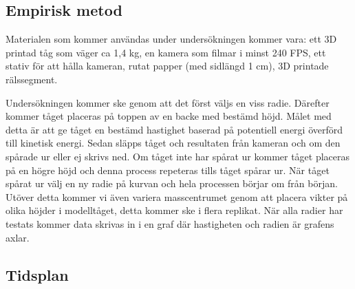 \subsection{Empirisk metod}
\label{sec:metod}
Materialen som kommer användas under undersökningen kommer vara: ett 3D printad tåg som väger ca 1,4 kg, en kamera som filmar i minst 240 FPS, ett stativ för att hålla kameran, rutat papper (med sidlängd 1 cm), 3D printade rälssegment.

Undersökningen kommer ske genom att det först väljs en viss radie. Därefter kommer tåget placeras på toppen av en backe med bestämd höjd. Målet med detta är att ge tåget en bestämd hastighet baserad på potentiell energi överförd till kinetisk energi. Sedan släpps tåget och resultaten från kameran och om den spårade ur eller ej skrivs ned. Om tåget inte har spårat ur kommer tåget placeras på en högre höjd och denna process repeteras tills tåget spårar ur. När tåget spårat ur välj en ny radie på kurvan och hela processen börjar om från början. Utöver detta kommer vi även variera masscentrumet genom att placera vikter på olika höjder i modelltåget, detta kommer ske i flera replikat. När alla radier har testats kommer data skrivas in i en graf där hastigheten och radien är grafens axlar.



\subsection{Tidsplan}

